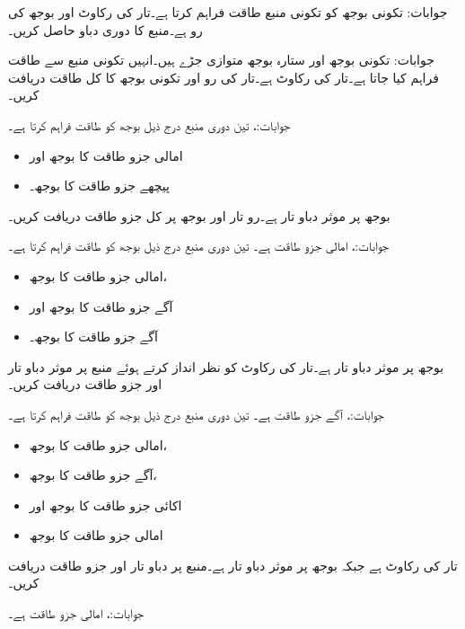 جوابات:
تکونی بوجھ  کو تکونی  منبع طاقت فراہم  کرتا ہے۔تار کی رکاوٹ  اور بوجھ کی رو 
  ہے۔منبع کا دوری دباو حاصل کریں۔

جوابات:
تکونی بوجھ   اور ستارہ بوجھ  متوازی جڑے ہیں۔انہیں تکونی منبع  سے طاقت فراہم کیا جاتا ہے۔تار کی رکاوٹ  ہے۔تار کی رو اور تکونی بوجھ کا کل طاقت دریافت کریں۔

جوابات:، 
تین دوری  منبع درج ذیل بوجھ کو طاقت فراہم کرتا ہے۔
\begin{itemize}
\item
{} امالی جزو طاقت کا  بوجھ اور
\item
{} پیچھے جزو طاقت کا  بوجھ۔
\end{itemize}
بوجھ پر موثر دباو تار  ہے۔رو تار اور بوجھ پر کل جزو طاقت دریافت کریں۔

جوابات:، امالی جزو طاقت  ہے۔
تین دوری  منبع درج ذیل بوجھ کو طاقت فراہم کرتا ہے۔
\begin{itemize}
\item
{} امالی جزو طاقت کا  بوجھ،
\item
{} آگے جزو طاقت کا  بوجھ اور
\item
{} آگے جزو طاقت کا  بوجھ۔
\end{itemize}
بوجھ پر موثر دباو تار  ہے۔تار کی رکاوٹ کو نظر انداز کرتے ہوئے منبع پر موثر دباو تار اور جزو طاقت دریافت کریں۔

جوابات:، آگے جزو طاقت  ہے۔
تین دوری  منبع درج ذیل بوجھ کو طاقت فراہم کرتا ہے۔
\begin{itemize}
\item
{} امالی جزو طاقت کا  بوجھ،
\item
{} آگے جزو طاقت کا  بوجھ،
\item
اکائی جزو طاقت کا  بوجھ اور
\item
{} امالی جزو طاقت کا  بوجھ
\end{itemize}
تار کی رکاوٹ  ہے جبکہ بوجھ پر موثر دباو تار  ہے۔منبع پر دباو تار اور جزو طاقت دریافت کریں۔

جوابات:، امالی جزو طاقت  ہے۔
